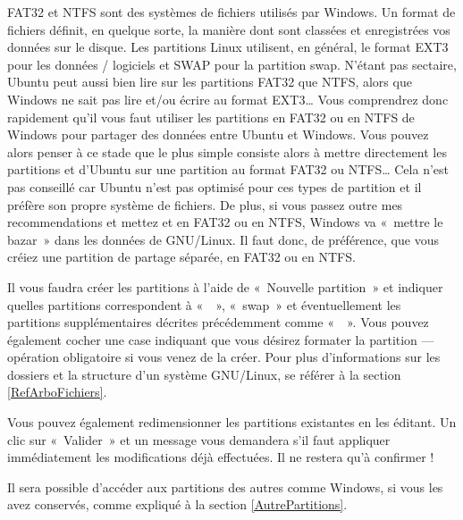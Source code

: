\begin{itemize}
\begin{nota}
FAT32 et NTFS sont des systèmes de fichiers utilisés par Windows. Un format de fichiers définit, en quelque sorte, la manière dont sont classées et enregistrées vos données sur le disque. Les partitions Linux utilisent, en général, le format EXT3 pour les données / logiciels et SWAP pour la partition swap. N'étant pas sectaire, Ubuntu peut aussi bien lire sur les partitions FAT32 que NTFS, alors que Windows ne sait pas lire et/ou écrire au format EXT3\ldots{} Vous comprendrez donc rapidement qu'il vous faut utiliser les partitions en FAT32 ou en NTFS de Windows pour partager des données entre Ubuntu et Windows. Vous pouvez alors penser à ce stade que le plus simple consiste alors à mettre directement les partitions  et \Chemin{/} d'Ubuntu sur une partition au format FAT32 ou NTFS\dots{} Cela n'est pas conseillé car Ubuntu n'est pas optimisé pour ces types de partition et il préfère son propre système de fichiers. De plus, si vous passez outre mes recommendations et mettez  et \Chemin{/} en FAT32 ou en NTFS, Windows va «~mettre le bazar~» dans les données de GNU/Linux. Il faut donc, de préférence, que vous créiez une partition de partage séparée, en FAT32 ou en NTFS.
\end{nota}
\end{itemize}\par
Il vous faudra créer les partitions à l'aide de «~Nouvelle partition~» et indiquer quelles partitions correspondent à «~\Chemin{/}~», «~swap~» et éventuellement les partitions supplémentaires décrites précédemment comme «~~». Vous pouvez également cocher une case indiquant que vous désirez formater la partition --- opération obligatoire si vous venez de la créer. Pour plus d'informations sur les dossiers et la structure d'un système GNU/Linux, se référer à la section \ref{RefArboFichiers}.\par
Vous pouvez également redimensionner les partitions existantes en les éditant. Un clic sur «~Valider~» et un message vous demandera s'il faut appliquer immédiatement les modifications déjà effectuées. Il ne restera qu'à confirmer !
\begin{nota}
Il sera possible d'accéder aux partitions des autres  comme Windows, si vous les avez conservés, comme expliqué à la section \ref{AutrePartitions}.
\end{nota}
